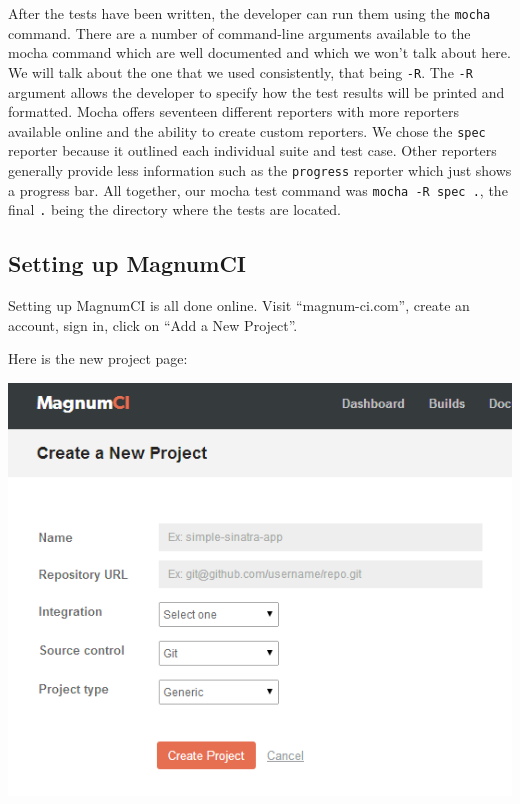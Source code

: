 \documentclass[12pt]{ucthesis}
\newenvironment{Figure}
  {\par\medskip\noindent\minipage{\linewidth}}
  {\endminipage\par\medskip}
\begin{document}
After the tests have been written, the developer can run them using the \lstinline{mocha} command. There are a number of command-line arguments available to the mocha command which are well documented and which we won't talk about here. We will talk about the one that we used consistently, that being \lstinline{-R}. The \lstinline{-R} argument allows the developer to specify how the test results will be printed and formatted. Mocha offers seventeen different reporters with more reporters available online and the ability to create custom reporters. We chose the \lstinline{spec} reporter because it outlined each individual suite and test case. Other reporters generally provide less information such as the \lstinline{progress} reporter which just shows a progress bar. All together, our mocha test command was \lstinline{mocha -R spec .}, the final \lstinline{.} being the directory where the tests are located.

\subsection{Setting up MagnumCI}
Setting up MagnumCI is all done online. Visit ``magnum-ci.com'', create an account, sign in, click on ``Add a New Project''.

Here is the new project page:
\begin{Figure}
  \centering
  \includegraphics[width=0.75\linewidth]{magnumCI_new_project.png}
\end{Figure}
\end{document}
